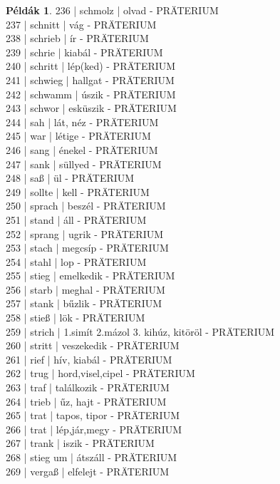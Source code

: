 \documentclass{article}
\theoremstyle{definition}
\newtheorem*{exmp}{Példák}
\begin{document}
\begin{exmp}
236 | schmolz | olvad - PRÄTERIUM\\
237 | schnitt | vág - PRÄTERIUM\\
238 | schrieb | ír - PRÄTERIUM\\
239 | schrie | kiabál - PRÄTERIUM\\
240 | schritt | lép(ked) - PRÄTERIUM\\
241 | schwieg | hallgat - PRÄTERIUM\\
242 | schwamm | úszik - PRÄTERIUM\\
243 | schwor | esküszik - PRÄTERIUM\\
244 | sah | lát, néz - PRÄTERIUM\\
245 | war | létige - PRÄTERIUM\\
246 | sang | énekel - PRÄTERIUM\\
247 | sank | süllyed - PRÄTERIUM\\
248 | saß | ül - PRÄTERIUM\\
249 | sollte | kell - PRÄTERIUM\\
250 | sprach | beszél - PRÄTERIUM\\
251 | stand | áll - PRÄTERIUM\\
252 | sprang | ugrik - PRÄTERIUM\\
253 | stach | megcsíp - PRÄTERIUM\\
254 | stahl | lop - PRÄTERIUM\\
255 | stieg | emelkedik - PRÄTERIUM\\
256 | starb | meghal - PRÄTERIUM\\
257 | stank | bűzlik - PRÄTERIUM\\
258 | stieß | lök - PRÄTERIUM\\
259 | strich | 1.simít 2.mázol 3. kihúz, kitöröl - PRÄTERIUM\\
260 | stritt | veszekedik - PRÄTERIUM\\
261 | rief | hív, kiabál - PRÄTERIUM\\
262 | trug | hord,visel,cipel - PRÄTERIUM\\
263 | traf | találkozik - PRÄTERIUM\\
264 | trieb | űz, hajt - PRÄTERIUM\\
265 | trat | tapos, tipor - PRÄTERIUM\\
266 | trat | lép,jár,megy - PRÄTERIUM\\
267 | trank | iszik - PRÄTERIUM\\
268 | stieg um | átszáll - PRÄTERIUM\\
269 | vergaß | elfelejt - PRÄTERIUM\\

\end{exmp}
\end{document}
